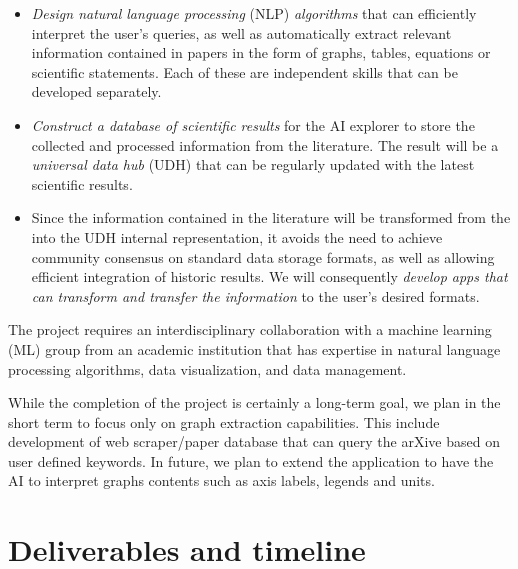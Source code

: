 \documentclass{article}[12pt,preprint]
\begin{document}
\begin{itemize}

\item
{\it Design natural language processing} (NLP) {\it algorithms} that
can efficiently interpret the user's queries, as well as automatically
extract relevant information contained in papers in the form of graphs,
tables, equations or scientific statements.  Each of these are
independent skills that can be developed separately.

\item
{\it Construct a database of scientific results} for the AI explorer
to store the collected and processed information from the literature.
The result will be a \emph{universal data hub} (UDH) that can be
regularly updated with the latest scientific results.

\item 
Since the information contained in the literature will be transformed
from the into the UDH internal representation, it avoids the need to
achieve community consensus on standard data storage formats, as well as
allowing efficient integration of historic results.
We will consequently {\it develop apps that can transform and transfer
the information} to the user's desired formats.

\end{itemize}

The project requires an interdisciplinary collaboration with a
machine learning (ML) group from an academic institution that
has expertise in natural language processing algorithms, data
visualization, and data management.  

{\color{red}
While the completion of the project is certainly a long-term goal, 
we plan in the short term to focus only on graph extraction capabilities.
This include development of web scraper/paper database that can 
query the arXive based on user defined keywords. In future, we plan to
extend the application to have the AI to interpret  graphs contents 
such as axis labels, legends and units.
}


\newpage
\section{Deliverables and timeline}
\end{document}
